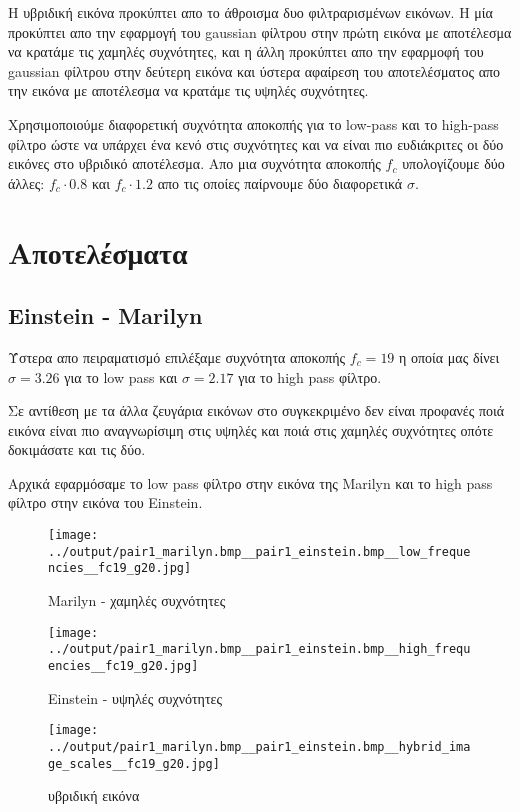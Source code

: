 \documentclass[11pt]{scrartcl} %
\begin{document}
Η υβριδική εικόνα προκύπτει απο το άθροισμα δυο φιλτραρισμένων εικόνων. Η μία προκύπτει απο την εφαρμογή του gaussian φίλτρου στην πρώτη εικόνα με αποτέλεσμα να κρατάμε τις χαμηλές συχνότητες, και η άλλη προκύπτει απο την εφαρμοφή του gaussian φίλτρου στην δεύτερη εικόνα και ύστερα αφαίρεση του αποτελέσματος απο την εικόνα με αποτέλεσμα να κρατάμε τις υψηλές συχνότητες.

Χρησιμοποιούμε διαφορετική συχνότητα αποκοπής για το low-pass και το high-pass φίλτρο ώστε να υπάρχει ένα κενό στις συχνότητες και να είναι πιο ευδιάκριτες οι δύο εικόνες στο υβριδικό αποτέλεσμα. Απο μια συχνότητα αποκοπής $f_c$ υπολογίζουμε δύο άλλες: $f_c \cdot 0.8$ και $f_c \cdot 1.2$ απο τις οποίες παίρνουμε δύο διαφορετικά $\sigma$.

\section{Αποτελέσματα}

\subsection{Einstein - Marilyn}

Ύστερα απο πειραματισμό επιλέξαμε συχνότητα αποκοπής $f_c = 19$ η οποία μας δίνει $\sigma = 3.26$ για το low pass και $\sigma = 2.17$ για το high pass φίλτρο.

Σε αντίθεση με τα άλλα ζευγάρια εικόνων στο συγκεκριμένο δεν είναι προφανές ποιά εικόνα είναι πιο αναγνωρίσιμη στις υψηλές και ποιά στις χαμηλές συχνότητες οπότε δοκιμάσατε και τις δύο.

Αρχικά εφαρμόσαμε το low pass φίλτρο στην εικόνα της Marilyn και το high pass φίλτρο στην εικόνα του Einstein.

\begin{figure}[H]
  \begin{minipage}[c]{8cm}
    \texttt{[image: ../output/pair1\_marilyn.bmp\_\_pair1\_einstein.bmp\_\_low\_frequencies\_\_fc19\_g20.jpg]}
    \caption{Marilyn - χαμηλές συχνότητες}
  \end{minipage}
  \begin{minipage}[c]{8cm}
    \texttt{[image: ../output/pair1\_marilyn.bmp\_\_pair1\_einstein.bmp\_\_high\_frequencies\_\_fc19\_g20.jpg]}
    \caption{Einstein - υψηλές συχνότητες}
  \end{minipage}
\end{figure}

\begin{figure}[H]
  \texttt{[image: ../output/pair1\_marilyn.bmp\_\_pair1\_einstein.bmp\_\_hybrid\_image\_scales\_\_fc19\_g20.jpg]}
  \caption{υβριδική εικόνα}
\end{figure}
\end{document}

